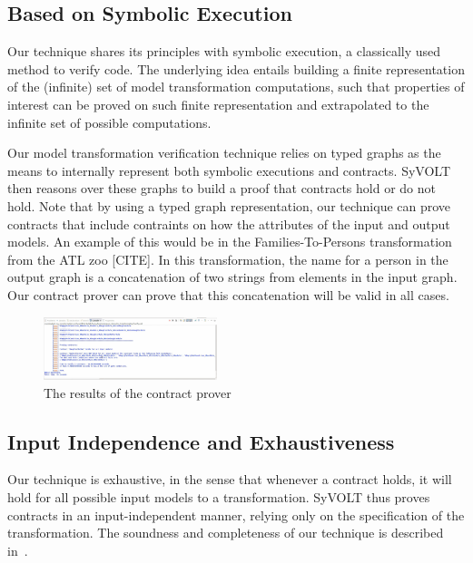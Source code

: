 \subsection{Based on Symbolic Execution}

Our technique shares its principles with symbolic execution, a
classically used method to verify code. The underlying idea entails building a
finite representation of the (infinite) set of model transformation
computations, such that properties of interest can be proved on such finite
representation and extrapolated to the infinite set of possible computations.

Our model transformation verification technique relies on typed graphs as the
means to internally represent both symbolic executions and contracts. SyVOLT
then reasons over these graphs to build a proof that contracts hold or do not
hold. Note that by using a typed graph representation, our technique can prove
contracts that include contraints on how the attributes of the input and output
models. An example of this would be in the Families-To-Persons transformation
from the ATL zoo [CITE]. In this transformation, the name for a person in the
output graph is a concatenation of two strings  from elements in the input graph. Our contract prover
can prove that this concatenation will be valid in all cases.

\begin{figure}
\centering
\includegraphics[width=0.45\textwidth]{figures/output}
\caption{The results of the contract prover}
\label{fig:output}
\end{figure}

\subsection{Input Independence and Exhaustiveness} 

Our technique is exhaustive, in the sense that whenever a contract holds, it
will hold for all possible input models to a transformation. SyVOLT thus proves
contracts in an input-independent manner, relying only on the specification of
the transformation. The soundness and completeness of our technique is described
in~\cite{Lucio2014}.

